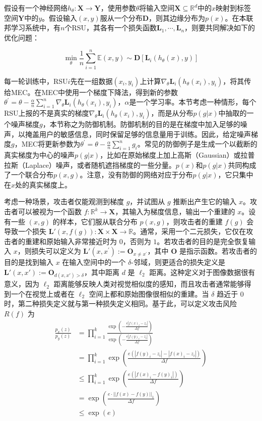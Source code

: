 假设有一个神经网络$h_\theta:\mathbf{X}\to\mathbf{Y}$，使用参数$\theta$将输入空间$\mathbf{X}\subseteq\mathbb{R}^d$中的$x$映射到标签空间$\mathbf{Y}$中的$y$。假设输入$(x,y)$服从一个分布$\mathbf{D}$，则其边缘分布为$p(x)$。在本联邦学习系统中，有$n$个RSU，其各有一个损失函数$\mathbf{L}_1,\cdots,\mathbf{L}_n$，则要共同解决如下的优化问题：

\begin{equation}
\min_\theta\frac{1}{n}\sum_{i=1}^n\mathbb{E}{(x,y)\sim\mathbf{D}}\left[\mathbf{L}_i(h_\theta(x),y)\right]
\end{equation}

每一轮训练中，RSU$i$先在一组数据$(x_i,y_i)$上计算$\nabla_\theta \mathbf{L}_i(h_\theta(x_i),y_i)$，将其传给MEC。在MEC中使用一个梯度下降法，得到新的参数$\theta^{\prime}=\theta-\frac\alpha n\sum_{i=1}^n\nabla_\theta \mathbf{L}_i(h_\theta(x_i),y_i)$，$\alpha$是一个学习率。本节考虑一种情形，每个RSU上报的不是真实的梯度$\nabla_\theta \mathbf{L}_i(h_\theta(x_i),y_i)$，而是从分布$p(g|x)$中抽取的一个噪声梯度$g$，本节称之为防御机制。防御机制的目的是在梯度中加入足够的噪声，以掩盖用户的敏感信息，同时保留足够的信息量用于训练。因此，给定噪声梯度$g$，MEC将更新参数为$\theta^{\prime}=\theta-\frac\alpha n\sum_{i=1}^n g_i$。常见的防御例子是生成一个以截断的真实梯度为中心的噪声$p(g|x)$，比如在原始梯度上加上高斯（Gaussian）或拉普拉斯（Laplace）噪声，或者随机遮挡梯度的一些分量。$p(x)$和$p(g|x)$共同构成了一个联合分布$p(x,g)$。注意，没有防御的网络对应于分布$p(g|x)$，它只集中在$x$处的真实梯度上。

考虑一种场景，攻击者仅能观测到梯度 $g$，并试图从 $g$ 推断出产生它的输入 $x$。攻击者可以被视为一个函数 $f:\mathbb{R}^k\to \mathbf{X}$，其输入为梯度信息，输出一个重建的 $x$。设有一些 $(x,g)$ 的样本，它们服从联合分布 $p(x,g)$，则攻击者的重建 $f(g)$ 会导致一个损失 $\mathbf{L}'(x,f(g)):\mathbf{X}\times \mathbf{X} \to \mathbb{R}$。通常，采用一个二元损失，它仅在攻击者的重建和原始输入非常接近时为 $0$，否则为 $1$。若攻击者的目的是完全恢复输入 $x$，则损失可以定义为 $\mathbf{L}'(x,x^{\prime}):=\mathbf{O}_{x\neq x^{\prime}}$，其中 $\mathbf{O}$ 是指示函数。若攻击者的目的是找到输入 $x$ 在输入空间中的一个 $\delta$-邻域，则更适合的损失定义是 $\mathbf{L}'(x,x'):= \mathbf{O}_{d(x,x')>\delta}$，其中距离 $d$ 是 $\ell_{2}$ 距离。这种定义对于图像数据很有意义，因为 $\ell_{2}$ 距离能够反映人类对视觉相似度的感知，而且攻击者通常能够得到一个在视觉上或者在 $\ell_{2}$ 空间上都和原始图像很相似的重建。当 $\delta$ 趋近于 0 时，第二种损失定义就与第一种损失定义相同。基于此，可以定义攻击风险 $R(f)$ 为
\begin{equation}
\begin{aligned}
\frac{p_x(z)}{p_y(z)} &= \prod_{i=1}^{k} \frac{\exp\left(-\frac{e|f(x)_i - z_i|}{\Delta f}\right)}{\exp\left(-\frac{e|f(y)_i - z_i|}{\Delta f}\right)} \\
&= \prod_{i=1}^{k} \exp\left(\frac{e(|f(y)_i - z_i| - |f(x)_i - z_i|)}{\Delta f}\right) \\
& \leq \prod_{i=1}^{k} \exp\left(\frac{e(|f(x)_i - f(y)_i|)}{\Delta f}\right) \\
&= \exp\left(\frac{e \cdot ||f(x) - f(y)||_1 }{{\Delta f}}\right) \\
&\leq \exp(e)
\end{aligned}
\end{equation}


